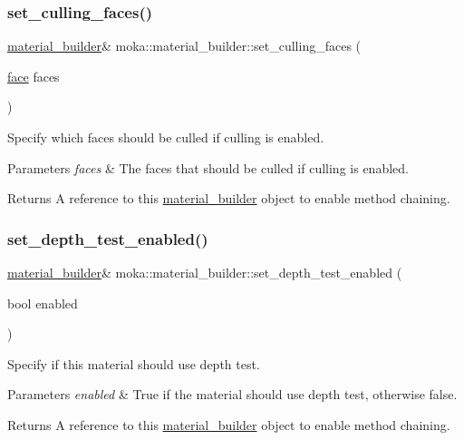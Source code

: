 \subsubsection{\texorpdfstring{set\_culling\_faces()}{set\_culling\_faces()}}
{\footnotesize\ttfamily \mbox{\hyperlink{classmoka_1_1material__builder}{material\+\_\+builder}}\& moka\+::material\+\_\+builder\+::set\+\_\+culling\+\_\+faces (\begin{DoxyParamCaption}\item[{\mbox{\hyperlink{namespacemoka_a262acd665924ba4041f64f7207b17cbe}{face}}}]{faces }\end{DoxyParamCaption})}



Specify which faces should be culled if culling is enabled. 


\begin{DoxyParams}{Parameters}
{\em faces} & The faces that should be culled if culling is enabled. \\
\hline
\end{DoxyParams}
\begin{DoxyReturn}{Returns}
A reference to this \mbox{\hyperlink{classmoka_1_1material__builder}{material\+\_\+builder}} object to enable method chaining. 
\end{DoxyReturn}
\mbox{\label{classmoka_1_1material__builder_ade5b3800ab919d3c842aa76f70fdf499}} 
\subsubsection{\texorpdfstring{set\_depth\_test\_enabled()}{set\_depth\_test\_enabled()}}
{\footnotesize\ttfamily \mbox{\hyperlink{classmoka_1_1material__builder}{material\+\_\+builder}}\& moka\+::material\+\_\+builder\+::set\+\_\+depth\+\_\+test\+\_\+enabled (\begin{DoxyParamCaption}\item[{bool}]{enabled }\end{DoxyParamCaption})}



Specify if this material should use depth test. 


\begin{DoxyParams}{Parameters}
{\em enabled} & True if the material should use depth test, otherwise false. \\
\hline
\end{DoxyParams}
\begin{DoxyReturn}{Returns}
A reference to this \mbox{\hyperlink{classmoka_1_1material__builder}{material\+\_\+builder}} object to enable method chaining. 
\end{DoxyReturn}
\mbox{\label{classmoka_1_1material__builder_a116f4590c6b6a0eda08be0b8a7223532}} 
